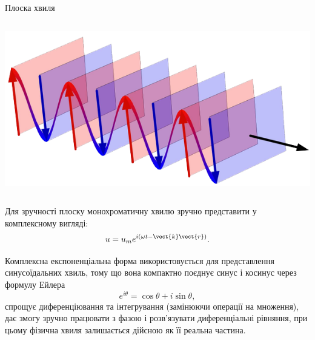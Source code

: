 \documentclass[onlytextwidth]{beamer}
\begin{document}
\begin{frame}{Плоска хвиля}
\begin{columns}
\begin{column}{0.4\linewidth}
\begin{overprint}
\begin{center}
				\end{center}
				\begin{center}
					\includegraphics[width=\linewidth]{plane_wave}
				\end{center}
			\end{overprint}
		\end{column}
	\end{columns}
	\begin{block}{}\justifying
		Для зручності плоску монохроматичну хвилю зручно представити у комплексному вигляді:
		\begin{equation*}
			u = u_m e^{i(\omega t -\vect{k}\vect{r})}.
		\end{equation*}
	\end{block}
	\begin{alertblock}{}\justifying\scriptsize
		Комплексна експоненціальна форма використовується для представлення синусоїдальних хвиль, тому що вона компактно поєднує синус і косинус через
		формулу Ейлера
		\begin{equation*}
			e^{i\theta} = \cos\theta + i\sin\theta,
		\end{equation*}
		спрощує диференціювання та інтегрування (замінюючи операції на множення), дає змогу зручно працювати з фазою і розв'язувати диференціальні рівняння,
		при цьому фізична хвиля залишається дійсною як її реальна частина.
	\end{alertblock}
\end{frame}
\end{document}
